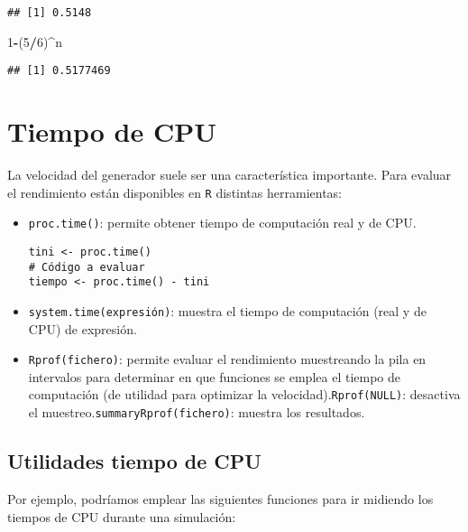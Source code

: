 \documentclass[
]{book}
\newenvironment{Shaded}{\begin{snugshade}}{\end{snugshade}}
\newcommand{\DecValTok}[1]{\textcolor[rgb]{0.00,0.00,0.81}{#1}}
\newcommand{\NormalTok}[1]{#1}
\newcommand{\OperatorTok}[1]{\textcolor[rgb]{0.81,0.36,0.00}{\textbf{#1}}}
\theoremstyle{break}
\theoremstyle{definition}
\theoremstyle{definition}
\theoremstyle{definition}
\theoremstyle{remark}
\begin{document}
\begin{enumerate}
\begin{verbatim}
## [1] 0.5148
\end{verbatim}

\begin{Shaded}
\begin{Highlighting}[]
\DecValTok{1}\OperatorTok{-}\NormalTok{(}\DecValTok{5}\OperatorTok{/}\DecValTok{6}\NormalTok{)}\OperatorTok{^}\NormalTok{n}
\end{Highlighting}
\end{Shaded}

\begin{verbatim}
## [1] 0.5177469
\end{verbatim}
\end{enumerate}

\hypertarget{tiempo-de-cpu}{%
\section{Tiempo de CPU}\label{tiempo-de-cpu}}

La velocidad del generador suele ser una característica importante.
Para evaluar el rendimiento están disponibles en \texttt{R} distintas herramientas:

\begin{itemize}
\item
  \texttt{proc.time()}: permite obtener tiempo de computación real y de
  CPU.

\begin{verbatim}
tini <- proc.time()
# Código a evaluar
tiempo <- proc.time() - tini
\end{verbatim}
\item
  \texttt{system.time(expresión)}: muestra el tiempo de computación (real y
  de CPU) de expresión.
\item
  \texttt{Rprof(fichero)}: permite evaluar el rendimiento muestreando la pila
  en intervalos para determinar en que funciones se emplea el tiempo
  de computación (de utilidad para optimizar la
  velocidad).\texttt{Rprof(NULL)}: desactiva el
  muestreo.\texttt{summaryRprof(fichero)}: muestra los resultados.
\end{itemize}

\hypertarget{utilidades-tiempo-de-cpu}{%
\subsection{Utilidades tiempo de CPU}\label{utilidades-tiempo-de-cpu}}

Por ejemplo, podríamos emplear las siguientes funciones para
ir midiendo los tiempos de CPU durante una simulación:
\end{document}
